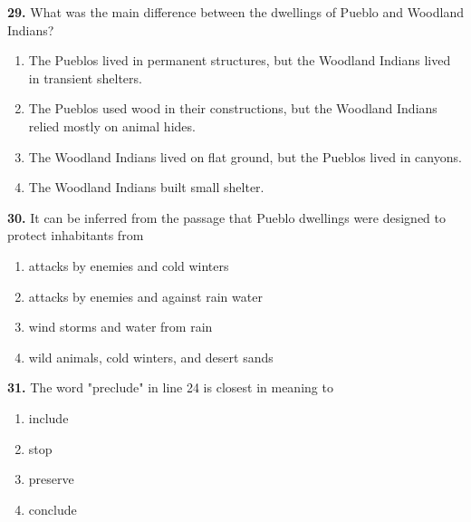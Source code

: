 \documentclass[12pt]{article}
\begin{document}
\par
\vspace{0.25\baselineskip}
\noindent\textbf{29.} What was the main difference between the dwellings of Pueblo and Woodland Indians?
\begin{enumerate}[label=(\Alph*),leftmargin=*,itemsep=0.2em]
\item The Pueblos lived in permanent structures, but the Woodland Indians lived in transient shelters.
\item The Pueblos used wood in their constructions, but the Woodland Indians relied mostly on animal hides.
\item The Woodland Indians lived on flat ground, but the Pueblos lived in canyons.
\item The Woodland Indians built small shelter.
\end{enumerate}
\par
\vspace{0.25\baselineskip}
\noindent\textbf{30.} It can be inferred from the passage that Pueblo dwellings were designed to protect inhabitants from
\begin{enumerate}[label=(\Alph*),leftmargin=*,itemsep=0.2em]
\item attacks by enemies and cold winters
\item attacks by enemies and against rain water
\item wind storms and water from rain
\item wild animals, cold winters, and desert sands
\end{enumerate}
\par
\vspace{0.25\baselineskip}
\noindent\textbf{31.} The word "preclude" in line 24 is closest in meaning to
\begin{enumerate}[label=(\Alph*),leftmargin=*,itemsep=0.2em]
\item include
\item stop
\item preserve
\item conclude
\end{enumerate}
\par
\vspace{0.25\baselineskip}
\end{document}
